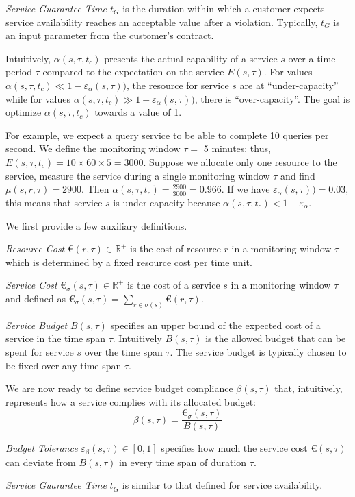 \emph{Service Guarantee Time $t_G$} is the duration within which a customer expects service availability reaches an acceptable value after a violation. 
Typically, $t_G$ is an input parameter from the customer's contract.


\begin{exmp}
Intuitively, $\alpha(s,\tau,t_c)$ presents the actual capability of a service $s$ over a time period $\tau$ compared to the expectation on the service $E(s,\tau)$. 
For values $\alpha(s,\tau,t_c) \ll 1 - \varepsilon_\alpha(s,\tau))$, the resource for service $s$ are at ``under-capacity'' while for values $\alpha(s,\tau,t_c) \gg 1 + \varepsilon_\alpha(s,\tau))$, there is ``over-capacity''. The goal is optimize $\alpha(s,\tau,t_c)$ towards a value of 1.
% 

For example, we expect a query service to be able to complete 10 queries per second. 
We define the monitoring window $\tau = $ 5 minutes; thus, $E(s,\tau,t_c) = 10 \times 60 \times 5 = 3000$.
Suppose we allocate only one resource to the service,
measure the service during a single monitoring window $\tau$
and find $\mu(s,r,\tau) = 2900$. Then $\alpha(s,\tau,t_c) = \frac{2900}{3000} = 0.966$.
If we have $\varepsilon_\alpha(s,\tau)) = 0.03$, this means that service $s$ is under-capacity because $\alpha(s,\tau,t_c) < 1 - \varepsilon_\alpha$.
\end{exmp}

\begin{defn}
\label{ch04:def:budget:compliance}
% 
We first provide a few auxiliary definitions.
% 

\emph{Resource Cost} $\euro(r,\tau) \in \mathbb{R}^+$ is the cost of resource $r$ in a monitoring window $\tau$ which is determined by a fixed resource cost per time unit.

\emph{Service Cost} $\euro_\sigma(s,\tau) \in \mathbb{R}^+$ is the cost of a service $s$ in a monitoring window $\tau$ and defined as $\euro_\sigma(s,\tau) = \sum_{r \in \sigma(s)} \euro(r,\tau)$.
% 

\emph{Service Budget} $B(s,\tau)$ specifies an upper bound of the expected cost of a service in the time span $\tau$.
Intuitively $B(s,\tau)$ is the allowed budget that can be spent for service $s$ over the time span $\tau$.
The service budget is typically chosen to be fixed over any time span $\tau$.
% 

We are now ready to define service budget compliance $\beta(s,\tau)$ that,
intuitively, represents how a service complies with its allocated budget:
\[
\beta(s,\tau) = \frac{\euro_\sigma(s,\tau)}{B(s,\tau)}
\]

\emph{Budget Tolerance} $\varepsilon_\beta(s,\tau) \in [0,1]$ specifies how much the service cost $\euro(s,\tau)$ can deviate from $B(s,\tau)$ in every time span of duration $\tau$.

\emph{Service Guarantee Time} $t_G$ is similar to that defined for service availability.
% 
\end{defn} %

